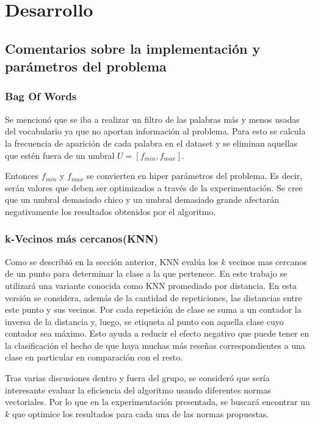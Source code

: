 
\section{Desarrollo}
\subsection{Comentarios sobre la implementación y parámetros del problema}
\subsubsection*{Bag Of Words}
Se mencionó que se iba a realizar un filtro de las palabras más y menos usadas del vocabulario ya que no aportan información al problema. Para esto se calcula la frecuencia de aparición de cada palabra en el dataset y se eliminan aquellas que estén fuera de un umbral $U = [f_{min}, f_{max}]$. 

Entonces $f_{min}$ y $f_{max}$ se convierten en hiper parámetros del problema. Es decir, serán valores que deben ser optimizados a través de la experimentación. Se cree que un umbral demasiado chico y un umbral demasiado grande afectarán negativamente los resultados obtenidos por el algoritmo.  

\subsubsection*{k-Vecinos más cercanos(KNN)}
Como se describió en la sección anterior, KNN evalúa los $k$ vecinos mas cercanos de un punto para determinar la clase a la que pertenece. En este trabajo se utilizará una variante conocida como KNN promediado por distancia. En esta versión se considera, además de la cantidad de repeticiones, las distancias entre este punto y sus vecinos. Por cada repetición de clase se suma a un contador la inversa de la distancia y, luego, se etiqueta al punto con aquella clase cuyo contador sea máximo. Esto ayuda a reducir el efecto negativo que puede tener en la clasificación el hecho de que haya muchas más reseñas correspondientes a una clase en particular en comparación con el resto.

Tras varias discusiones dentro y fuera del grupo, se consideró que sería interesante evaluar la eficiencia del algoritmo usando diferentes normas vectoriales. Por lo que en la experimentación presentada, se buscará encontrar un $k$ que optimice los resultados para cada una de las normas propuestas.

